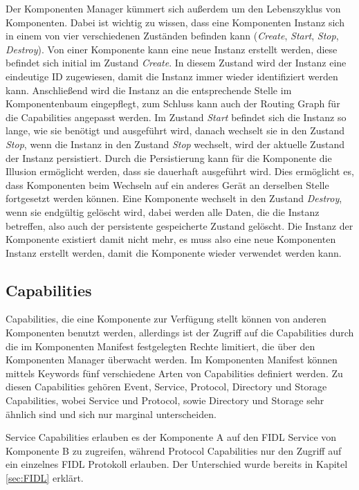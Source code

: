 \documentclass[a4paper]{scrartcl}
\begin{document}
Der Komponenten Manager kümmert sich außerdem um den Lebenszyklus von Komponenten. Dabei ist wichtig zu wissen, dass eine Komponenten Instanz sich in einem von vier verschiedenen Zuständen befinden kann (\textit{Create}, \textit{Start}, \textit{Stop}, \textit{Destroy}). Von einer Komponente kann eine neue Instanz erstellt werden, diese befindet sich initial im Zustand \textit{Create}. In diesem Zustand wird der Instanz eine eindeutige ID zugewiesen, damit die Instanz immer wieder identifiziert werden kann. Anschließend wird die Instanz an die entsprechende Stelle im Komponentenbaum eingepflegt, zum Schluss kann auch der Routing Graph für die Capabilities angepasst werden. Im Zustand \textit{Start} befindet sich die Instanz so lange, wie sie benötigt und ausgeführt wird, danach wechselt sie in den Zustand \textit{Stop}, wenn die Instanz in den Zustand \textit{Stop} wechselt, wird der aktuelle Zustand der Instanz persistiert. Durch die Persistierung kann für die Komponente die Illusion ermöglicht werden, dass sie dauerhaft ausgeführt wird. Dies ermöglicht es, dass Komponenten beim Wechseln auf ein anderes Gerät an derselben Stelle fortgesetzt werden können. Eine Komponente wechselt in den Zustand \textit{Destroy}, wenn sie endgültig gelöscht wird, dabei werden alle Daten, die die Instanz betreffen, also auch der persistente gespeicherte Zustand gelöscht. Die Instanz der Komponente existiert damit nicht mehr, es muss also eine neue Komponenten Instanz erstellt werden, damit die Komponente wieder verwendet werden kann. \cite{Fuchsia.Component.Lifecycle}
\subsection{Capabilities}
\label{sec:Capabilities}
Capabilities, die eine Komponente zur Verfügung stellt können von anderen Komponenten benutzt werden, allerdings ist der Zugriff auf die Capabilities durch die im Komponenten Manifest festgelegten Rechte limitiert, die über den Komponenten Manager überwacht werden. Im Komponenten Manifest können mittels Keywords fünf verschiedene Arten von Capabilities definiert werden. Zu diesen Capabilities gehören Event, Service, Protocol, Directory und Storage Capabilities, wobei Service und Protocol, sowie Directory und Storage sehr ähnlich sind und sich nur marginal unterscheiden.

Service Capabilities erlauben es der Komponente A auf den FIDL Service von Komponente B zu zugreifen, während Protocol Capabilities nur den Zugriff auf ein einzelnes FIDL Protokoll erlauben. Der Unterschied wurde bereits in Kapitel \ref{sec:FIDL} erklärt.
\end{document}
